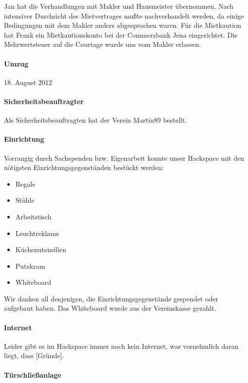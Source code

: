 \documentclass[10pt,DIV16]{scrartcl}
\begin{document}
Jan hat die Verhandlungen mit Makler und Hausmeister übernommen.  Nach
intensiver Durchsicht des Mietvertrages mußte nachverhandelt werden, da einige
Bedingungen mit dem Makler anders abgesprochen waren.  Für die Mietkaution hat
Frank ein Mietkautionskonto bei der Commerzbank Jena eingerichtet.  Die
Mehrwertsteuer auf die Courtage wurde uns vom Makler erlassen.

\paragraph{Umzug}

18. August 2012

\paragraph{Sicherheitsbeauftragter}

Als Sicherheitsbeauftragten hat der Verein Martin89 bestellt.

\paragraph{Einrichtung}

Vorrangig durch Sachspenden bzw. Eigenarbeit konnte unser Hackspace mit den
nötigsten Einrichtungsgegenständen bestückt werden:
\begin{itemize}
	\item Regale
	\item Stühle
	\item Arbeitstisch
	\item Leuchtreklame
	\item Küchenutensilien
	\item Putzkram
	\item Whiteboard
\end{itemize}
Wir danken all denjenigen, die Einrichtungsgegenstände gespendet oder
aufgebaut haben.  Das Whiteboard wurde aus der Vereinskasse gezahlt.

\paragraph{Internet}

Leider gibt es im Hackspace immer noch kein Internet, was vornehmlich daran
liegt, dass [Gründe].

\paragraph{Türschließanlage}
\end{document}
